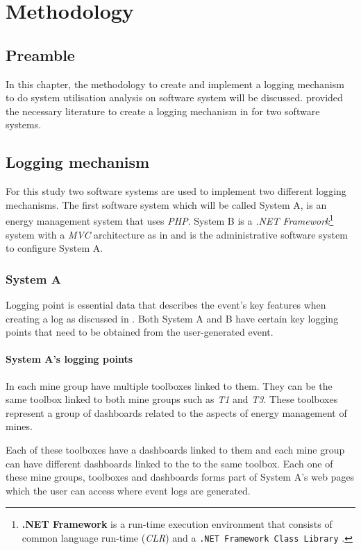 \chapter{Methodology}
\label{chap:2}

\section{Preamble}
In this chapter, the methodology to create and implement a logging mechanism to do system utilisation analysis on software system will be discussed.  provided the necessary literature to create a logging mechanism in  for two software systems.

\section{Logging mechanism}\label{sec:Ch3_LoggingMechanism}
For this study two software systems are used to implement two different logging mechanisms. The first software system which will be called System A, is an energy management system that uses \emph{PHP}. System B is a \emph{.NET Framework}\footnote{\label{ftn:NetFramework}\textbf{.NET Framework} is a run-time execution environment that consists of common language run-time (\emph{CLR}) and a \texttt{.NET Framework Class Library} \cite{Harkness2007}.} system with a \emph{MVC} architecture as in  and is the administrative software system to configure System A.

\clearpage

\subsection{System A}
Logging point is essential data that describes the event's key features when creating a log as discussed in . Both System A and B have certain key logging points that need to be obtained from the user-generated event.

\subsubsection{System A's logging points}\label{sec:SystemA_LoggingPoints}
In  each mine group have multiple toolboxes linked to them. They can be the same toolbox linked to both mine groups such as \emph{T1} and \emph{T3}. These toolboxes represent a group of dashboards related to the aspects of energy management of mines.\par Each of these toolboxes have a dashboards linked to them and each mine group can have different dashboards linked to the to the same toolbox. Each one of these mine groups, toolboxes and dashboards forms part of System A's web pages which the user can access where event logs are generated.


